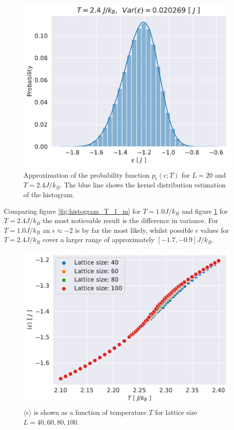 \documentclass[english,notitlepage,reprint,nofootinbib]{revtex4-1}  %
\begin{document}
\begin{figure}[H]
    \centering
    \includegraphics[width=.5\textwidth]{../figures/histogram_T_2_4_m.pdf}
    \caption{Approximation of the probability function $p_{\epsilon}(\epsilon ; T)$ for $L=20$ and $T=2.4 J/k_B$. The blue line shows the kernel distribution estimation of the histogram.}
    \label{fig:histogram_T_2_4_m}
\end{figure}
Comparing figure \ref{fig:histogram_T_1_m} for $T=1.0 J/k_B$ and figure \ref{fig:histogram_T_2_4_m} for $T=2.4 J/k_B$ the most noticeable result is the difference in variance. For $T=1.0 J/k_B$ an $\epsilon \approx -2$ is by far the most likely, whilst possible $\epsilon$ values for $T=2.4 J/k_B$ cover a larger range of approximately $[-1.7,-0.9]J/k_B$.

\begin{figure}[H]
    \centering
    \includegraphics[width=.5\textwidth]{../figures/L_size_e_T.pdf}
    \caption{$\langle \epsilon \rangle$ is shown as a function of temperature $T$ for lattice size $L= 40, 60,80,100$.}
    \label{fig:L_size_e_T}
\end{figure}
\end{document}
